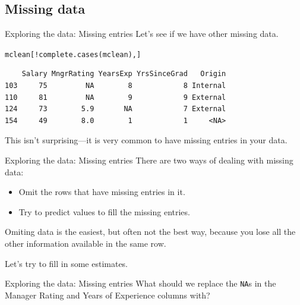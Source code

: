 \documentclass{beamer}\usepackage[]{graphicx}\usepackage[]{color}
\makeatletter
\newcommand{\hlopt}[1]{\textcolor[rgb]{1,0.894,0.769}{#1}}%
\newcommand{\hlstd}[1]{\textcolor[rgb]{1,0.894,0.769}{#1}}%
\newcommand{\hlkwd}[1]{\textcolor[rgb]{1,0.78,0.769}{#1}}%
\newenvironment{kframe}{%
 \def\at@end@of@kframe{}%
 \ifinner\ifhmode%
  \def\at@end@of@kframe{\end{minipage}}%
  \begin{minipage}{\columnwidth}%
 \fi\fi%
 \def\FrameCommand##1{\hskip\@totalleftmargin \hskip-\fboxsep
 \colorbox{shadecolor}{##1}\hskip-\fboxsep
     \hskip-\linewidth \hskip-\@totalleftmargin \hskip\columnwidth}%
 \MakeFramed {\advance\hsize-\width
   \@totalleftmargin\z@ \linewidth\hsize
   \@setminipage}}%
 {\par\unskip\endMakeFramed%
 \at@end@of@kframe}
\newenvironment{knitrout}{}{} %
\makeatother
\begin{document}
\begin{darkframes}
    \section{Missing data}

\begin{frame}[fragile]{Exploring the data: Missing entries}
      Let's see if we have other missing data. \pause
\begin{knitrout}
\begin{kframe}
\begin{alltt}
  \hlstd{mclean[}\hlopt{!}\hlkwd{complete.cases}\hlstd{(mclean),]}
\end{alltt}
\begin{verbatim}
    Salary MngrRating YearsExp YrsSinceGrad   Origin
103     75         NA        8            8 Internal
110     81         NA        9            9 External
124     73        5.9       NA            7 External
154     49        8.0        1            1     <NA>
\end{verbatim}
\end{kframe}
\end{knitrout}
      \pause
      This isn't surprising---it is very common to have missing entries in your data.
\end{frame}




\begin{frame}[fragile]{Exploring the data: Missing entries}
      There are two ways of dealing with missing data:
      \begin{itemize}[<+->]
        \item Omit the rows that have missing entries in it.
        \item Try to predict values to fill the missing entries.
      \end{itemize}
      Omiting data is the easiest, but often \alert{not the best way, because you lose all the other information available in the same row}. \pause \bigskip

      Let's try to fill in some estimates.
\end{frame}





\begin{frame}[fragile]{Exploring the data: Missing entries}
      What should we replace the \texttt{NA}s in the Manager Rating and Years of Experience columns with? \pause \bigskip


\end{frame}
\end{darkframes}
\end{document}
